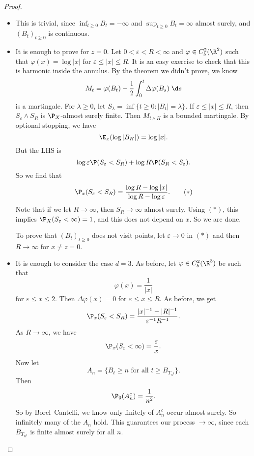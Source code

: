\documentclass[a4paper]{article}
\begin{document}
\begin{proof}\leavevmode
  \begin{itemize}
    \item This is trivial, since $\inf_{t \geq 0} B_t = -\infty$ and $\sup_{t \geq 0} B_t = \infty$ almost surely, and $(B_t)_{t \geq 0}$ is continuous.
    \item It is enough to prove for $z = 0$. Let $0 < \varepsilon < R < \infty$ and $\varphi \in C_b^2(\R^2)$ such that $\varphi(x) = \log |x|$ for $\varepsilon \leq |x| \leq R$. It is an easy exercise to check that this is harmonic inside the annulus. By the theorem we didn't prove, we know
      \[
        M_t = \varphi(B_t) - \frac{1}{2} \int_0^t \Delta \varphi (B_s)\;\d s
      \]
      is a martingale. For $\lambda \geq 0$, let $S_\lambda = \inf \{t \geq 0: |B_t| = \lambda\}$. If $\varepsilon \leq |x| \leq R$, then $S_\varepsilon \wedge S_R$ is $\P_X$-almost surely finite. Then $M_{t \wedge H}$ is a bounded martingale. By optional stopping, we have
      \[
        \E_x (\log |B_H|) = \log |x|.
      \]
      But the LHS is
      \[
        \log \varepsilon \P(S_\varepsilon < S_R) + \log R \P(S_R < S_\varepsilon).
      \]
      So we find that
      \[
        \P_x(S_\varepsilon < S_R) = \frac{\log R - \log |x|}{\log R - \log \varepsilon}.\tag{$*$}
      \]
      Note that if we let $R \to \infty$, then $S_R \to \infty$ almost surely. Using $(*)$, this implies $\P_X(S_\varepsilon < \infty) = 1$, and this does not depend on $x$. So we are done.

      To prove that $(B_t)_{t \geq 0}$ does not visit points, let $\varepsilon \to 0$ in $(*)$ and then $R \to \infty$ for $x \not= z = 0$.
    \item It is enough to consider the case $d = 3$. As before, let $\varphi \in C_b^2(\R^3)$ be such that
      \[
        \varphi(x) = \frac{1}{|x|}
      \]
      for $\varepsilon \leq x \leq 2$. Then $\Delta \varphi(x) = 0$ for $\varepsilon \leq x \leq R$. As before, we get
      \[
        \P_x(S_\varepsilon < S_R) = \frac{|x|^{-1} - |R|^{-1}}{\varepsilon^{-1} R^{-1}}.
      \]
      As $R \to \infty$, we have
      \[
        \P_x(S_\varepsilon < \infty) = \frac{\varepsilon}{x}.
      \]
      Now let
      \[
        A_n = \{B_t \geq n\text{ for all }t \geq B_{T_{n^3}}\}.
      \]
      Then
      \[
        \P_0(A_n^c) = \frac{1}{n^2}.
      \]
      So by Borel--Cantelli, we know only finitely of $A_n^c$ occur almost surely. So infinitely many of the $A_n$ hold. This guarantees our process $\to \infty$, since each $B_{T_{n^3}}$ is finite almost surely for all $n$. %
  \end{itemize}
\end{proof}
\end{document}
